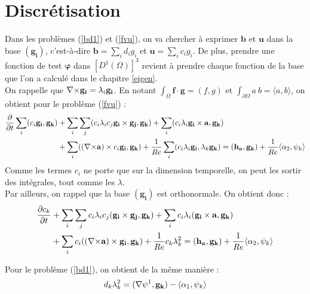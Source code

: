 \section{Discrétisation}
\label{discr}

Dans les problèmes (\ref{bd1}) et (\ref{fvu}), on va chercher à exprimer $\mathbf{b}$ et $\mathbf{u}$ dans la base $(\mathbf{g_i})$, c'est-à-dire $\mathbf{b}=\sum_i d_ig_i$ et $\mathbf{u}=\sum_i c_ig_i$. De plus, prendre une fonction de test $\bm{\varphi}$ dans $[D^1(\Omega)]^3$ revient à prendre chaque fonction de la base que l'on a calculé dans le chapitre \ref{eigen}.\\
On rappelle que ${\nabla\times} \mathbf{g_i}=\lambda_i\mathbf{g_i}$. En notant $\int_\Omega \mathbf{f}\cdot\mathbf{g}=(f,g)$ et $\int_{\partial\Omega}a\ b=\langle a,b\rangle$, on obtient pour le problème (\ref{fvu}) :
\begin{align*}
\frac{\partial}{\partial t}\sum_i (c_i\mathbf{g_i}, \mathbf{g_k}) &+ \sum_i\sum_j (c_i\lambda_ic_j\mathbf{g_i}\times \mathbf{g_j},\mathbf{g_k}) + \sum_i(c_i\lambda_i\mathbf{g_i}\times \mathbf{a},\mathbf{g_k})\\
&+ \sum_i (({\nabla\times} \mathbf{a})\times c_i\mathbf{g_i},\mathbf{g_k}) + \frac{1}{Re}\sum_i(c_i\lambda_i\mathbf{g_i}, \lambda_k\mathbf{g_k}) = (\mathbf{h_a},\mathbf{g_k}) + \frac{1}{Re}\langle\alpha_2,\psi_k\rangle
\end{align*}
Comme les termes $c_i$ ne porte que sur la dimension temporelle, on peut les
sortir des intégrales, tout comme les $\lambda$.\\

Par ailleurs, on rappel que la base $(\mathbf{g_i})$ est orthonormale. On obtient donc :
\begin{equation}
\label{fvspec}
\begin{aligned}
\frac{\partial c_k}{\partial t} &+ \sum_i\sum_j c_i\lambda_i c_j(\mathbf{g_i}\times \mathbf{g_j}, \mathbf{g_k}) + \sum_i c_i\lambda_i(\mathbf{g_i}\times \mathbf{a},\mathbf{g_k})\\
&+ \sum_i c_i(({\nabla\times} \mathbf{a})\times \mathbf{g_i}, \mathbf{g_k}) + \frac{1}{Re}c_k\lambda_k^2 = (\mathbf{h_a},\mathbf{g_k}) + \frac{1}{Re}\langle\alpha_2,\psi_k\rangle
\end{aligned}
\end{equation}

Pour le problème (\ref{bd1}), on obtient de la même manière :
\begin{equation}
\label{discbd1}
d_k\lambda_k^2 = ({\nabla}\psi^1,\mathbf{g_k}) - \langle\alpha_1,\psi_k\rangle
\end{equation}

